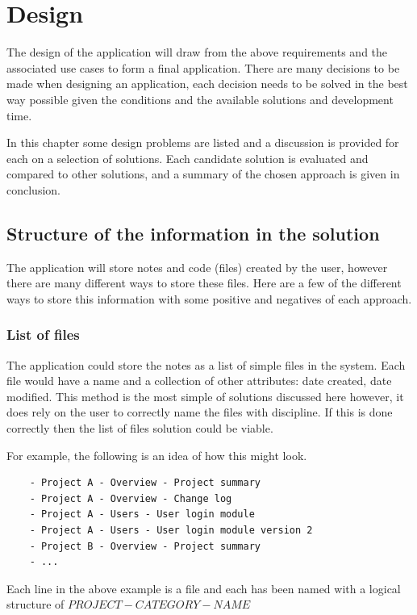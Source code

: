 \chapter{Design}\label{design}

The design of the application will draw from the above requirements and
the associated use cases to form a final application. There are many
decisions to be made when designing an application, each decision needs to be solved in the best way possible given the conditions and the available solutions and development time.

In this chapter some design problems are listed and a discussion is provided for each on a selection of solutions. Each candidate solution is evaluated and compared to other solutions, and a summary of the chosen approach is given in conclusion.

\section{Structure of the information in the solution}\label{structure-of-the-information-in-the-solution}

The application will store notes and code (files) created by the user, however
there are many different ways to store these files. Here are a few of the
different ways to store this information with some positive and negatives of each approach.

\subsection{List of files}\label{list-of-files}

The application could store the notes as a list of simple files in the system.
Each file would have a name and a collection of other attributes: date created,
date modified. This method is the most simple of solutions discussed here however, it does rely on the user to correctly name the files with discipline. If this is done correctly then the list of files solution could be viable.

For example, the following is an idea of how this might look.

\begin{verbatim}
    - Project A - Overview - Project summary
    - Project A - Overview - Change log
    - Project A - Users - User login module
    - Project A - Users - User login module version 2
    - Project B - Overview - Project summary
    - ...
\end{verbatim}
Each line in the above example is a file and each has been named with a logical structure of $ PROJECT - CATEGORY - NAME $

